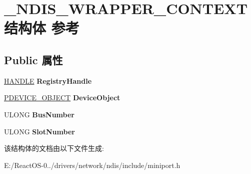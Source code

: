 \hypertarget{struct___n_d_i_s___w_r_a_p_p_e_r___c_o_n_t_e_x_t}{}\section{\+\_\+\+N\+D\+I\+S\+\_\+\+W\+R\+A\+P\+P\+E\+R\+\_\+\+C\+O\+N\+T\+E\+X\+T结构体 参考}
\label{struct___n_d_i_s___w_r_a_p_p_e_r___c_o_n_t_e_x_t}
\subsection*{Public 属性}
\begin{DoxyCompactItemize}
\item 
\mbox{\label{struct___n_d_i_s___w_r_a_p_p_e_r___c_o_n_t_e_x_t_af47d09799a99ac2cf42f7bf5b532eb73}} 
\hyperlink{interfacevoid}{H\+A\+N\+D\+LE} {\bfseries Registry\+Handle}
\item 
\mbox{\label{struct___n_d_i_s___w_r_a_p_p_e_r___c_o_n_t_e_x_t_af53ea382edb596264cbfee91ff7521c3}} 
\hyperlink{struct___d_e_v_i_c_e___o_b_j_e_c_t}{P\+D\+E\+V\+I\+C\+E\+\_\+\+O\+B\+J\+E\+CT} {\bfseries Device\+Object}
\item 
\mbox{\label{struct___n_d_i_s___w_r_a_p_p_e_r___c_o_n_t_e_x_t_a60346cc57404cecfdae82730510010a5}} 
U\+L\+O\+NG {\bfseries Bus\+Number}
\item 
\mbox{\label{struct___n_d_i_s___w_r_a_p_p_e_r___c_o_n_t_e_x_t_ac684965f4f75c109dcbb886b62a05315}} 
U\+L\+O\+NG {\bfseries Slot\+Number}
\end{DoxyCompactItemize}


该结构体的文档由以下文件生成\+:\begin{DoxyCompactItemize}
\item 
E\+:/\+React\+O\+S-\/0../drivers/network/ndis/include/miniport.\+h\end{DoxyCompactItemize}
